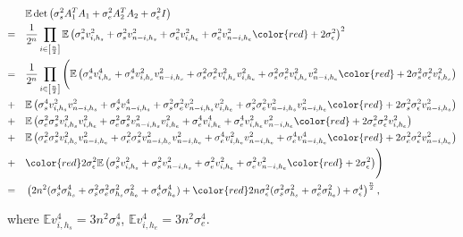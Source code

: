 \documentclass[12pt]{article}
\begin{document}
\begin{align*}
    \quad&\mathbb{E}\det\left( \sigma_{s}^2A_{1}^{T}A_{1}+\sigma_{e}^2A_{2}^{T}A_{2}+\sigma_\epsilon^2 I \right)\\
    =\quad& \frac{1}{2^n} \prod_{i\in\left[ \frac{n}{2} \right]}\mathbb{E} \left( \sigma_{s}^2v_{i,h_{s}}^2+\sigma_{s}^2v_{n-i,h_{s}}^2+\sigma_{e}^2v_{i,h_{e}}^2+\sigma_{e}^2v_{n-i,h_{e}}^2{\color{red} + 2\sigma_\epsilon^2} \right)^2\\
    =\quad& \frac{1}{2^n} \prod_{i\in\left[ \frac{n}{2} \right]} \Bigg(\mathbb{E} \left( \sigma_{s}^4v^4_{i,h_{s}}+\sigma_{s}^4v_{i,h_{s}}^2v_{n-i,h_{s}}^2+\sigma_{s}^2\sigma_{e}^2v_{i,h_{s}}^2v_{i,h_{e}}^2+\sigma_{s}^2\sigma_{e}^2v_{i,h_{s}}^2v_{n-i,h_{e}}^2  {\color{red}+2\sigma^2_s\sigma_\epsilon^2v_{i,h_{s}}^2}
    \right) \\
    +\quad& \mathbb{E}\left( \sigma_{s}^4v_{i,h_{s}}^2v_{n-i,h_{s}}^2+\sigma_{s}^4v_{n-i,h_{s}}^4+\sigma_{s}^2\sigma_{e}^2v_{n-i,h_{s}}^2v_{i,h_{e}}^2+\sigma_{s}^2\sigma_{e}^2v_{n-i,h_{s}}^2v_{n-i,h_{e}}^2{\color{red}+2\sigma^2_s\sigma_\epsilon^2v_{n-i,h_{s}}^2} \right) \\
    +\quad& \mathbb{E}\left( \sigma_{e}^2\sigma_{s}^2v_{i,h_{s}}^2v_{i,h_{e}}^2+\sigma_{e}^2\sigma_{s}^2v_{n-i,h_{s}}^2v_{i,h_{e}}^2+\sigma_{e}^4v_{i,h_{e}}^4+\sigma_{e}^4v_{i,h_{e}}^2v_{n-i,h_{e}}^2{\color{red}+2\sigma^2_e\sigma_\epsilon^2v_{i,h_{e}}^2} \right)\\
    +\quad&\mathbb{E}\left( \sigma_{e}^2\sigma_{s}^2v_{i,h_{s}}^2v_{n-i,h_{e}}^2+\sigma_{e}^2\sigma_{s}^2v_{n-i,h_{s}}^2v_{n-i,h_{e}}^2+\sigma_{e}^4v_{i,h_{e}}^2v_{n-i,h_{e}}^2+\sigma_{e}^4v_{n-i,h_{e}}^4{\color{red}+2\sigma^2_e\sigma_\epsilon^2v_{n-i,h_{e}}^2} \right)\\
    +\quad&{\color{red}2\sigma_\epsilon^2\mathbb{E}\left(  \sigma_{s}^2v_{i,h_{s}}^2+\sigma_{s}^2v_{n-i,h_{s}}^2+\sigma_{e}^2v_{i,h_{e}}^2+\sigma_{e}^2v_{n-i,h_{e}}^2{\color{red} + 2\sigma_\epsilon^2} 
    \right)}\Bigg) \\
    =\quad& \left( 2n^2(\sigma^4_s\sigma^4_{h_s}+\sigma^2_s\sigma^2_e\sigma^2_{h_s}\sigma^2_{h_e}+\sigma^4_e\sigma^4_{h_e})+ {\color{red}2n\sigma^2_\epsilon(\sigma^2_s\sigma^2_{h_s}+\sigma^2_e\sigma^2_{h_e})+\sigma^4_\epsilon} \right)^{\frac{n}{2}}
    ,
\end{align*}

where $\mathbb{E}v_{i,h_{s}}^4=3n^2\sigma_{s}^4$, $\mathbb{E}v_{i,h_{e}}^4=3n^2\sigma_{e}^4$.
\end{document}
